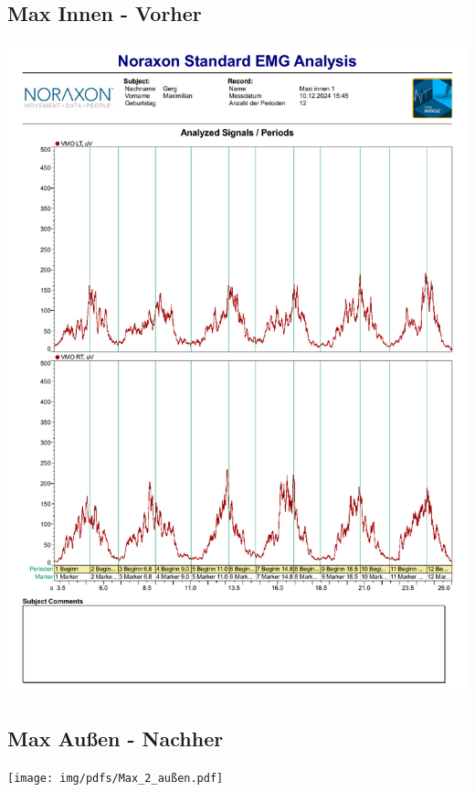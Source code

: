 \subsection*{Max Innen - Vorher}
\includegraphics[width=.9\textwidth]{img/pdfs/Maxi_Innen_1.pdf}
\clearpage

\subsection*{Max Außen - Nachher}
\texttt{[image: img/pdfs/Max\_2\_außen.pdf]}
\clearpage


